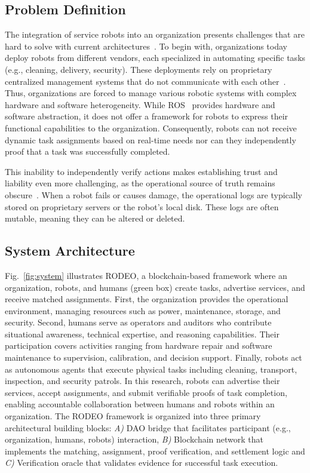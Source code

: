 \documentclass[letterpaper, 10 pt, conference]{ieeeconf}  %
\begin{document}
\subsection{Problem Definition}
The integration of service robots into an organization presents challenges that are hard to solve with current architectures~\cite{robot-fleet}. To begin with, organizations today deploy robots from different vendors, each specialized in automating specific tasks (e.g., cleaning, delivery, security). These deployments rely on proprietary centralized management systems that do not communicate with each other~\cite{decentralized-robots}. Thus, organizations are forced to manage various robotic systems with complex hardware and software heterogeneity. While ROS~\cite{288} provides hardware and software abstraction, it does not offer a framework for robots to express their functional capabilities to the organization. Consequently, robots can not receive dynamic task assignments based on real-time needs nor can they independently proof that a task was successfully completed.

This inability to independently verify actions makes establishing trust and liability even more challenging, as the operational source of truth remains obscure~\cite{Winfield2017}. When a robot fails or causes damage, the operational logs are typically stored on proprietary servers or the robot’s local disk. These logs are often mutable, meaning they can be altered or deleted.

\subsection{System Architecture}
Fig.~\ref{fig:system} illustrates RODEO, a blockchain-based framework where an organization, robots, and humans (green box) create tasks, advertise services, and receive matched assignments. First, the organization  provides the operational environment, managing resources such as power, maintenance, storage, and security. Second, humans serve as operators and auditors who contribute situational awareness, technical expertise, and reasoning capabilities. Their participation covers activities ranging from hardware repair and software maintenance to supervision, calibration, and decision support. Finally, robots act as autonomous agents that execute physical tasks including cleaning, transport, inspection, and security patrols. In this research, robots can advertise their services, accept assignments, and submit verifiable proofs of task completion, enabling accountable collaboration between humans and robots within an organization. The RODEO framework is organized into three primary architectural building blocks: \emph{A)} DAO bridge that facilitates participant (e.g., organization, humans, robots) interaction, \emph{B)} Blockchain network that implements the matching, assignment, proof verification, and settlement logic and \emph{C)} Verification oracle that validates evidence for successful task execution.
\end{document}
